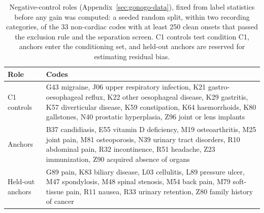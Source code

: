 \begin{table}[t]
\caption{Negative-control roles (Appendix~\ref{sec:gonogo-data}), fixed from label statistics before any gain was computed: a seeded random split, within two recording categories, of the 33 non-cardiac codes with at least 250 clean onsets that passed the exclusion rule and the separation screen. C1 controls test condition C1, anchors enter the conditioning set, and held-out anchors are reserved for estimating residual bias.}
\label{tab:gonogo-roles}
\centering
\small
\begin{tabular}{@{}lp{}@{}}
\toprule
\textbf{Role} & \textbf{Codes} \\
\midrule
C1 controls & G43 migraine, J06 upper respiratory infection, K21 gastro-oesophageal reflux, K22 other oesophageal disease, K29 gastritis, K57 diverticular disease, K59 constipation, K64 haemorrhoids, K80 gallstones, N40 prostatic hyperplasia, Z96 joint or lens implants \\
Anchors & B37 candidiasis, E55 vitamin D deficiency, M19 osteoarthritis, M25 joint pain, M81 osteoporosis, N39 urinary tract disorders, R10 abdominal pain, R32 incontinence, R51 headache, Z23 immunization, Z90 acquired absence of organs \\
Held-out anchors & G89 pain, K83 biliary disease, L03 cellulitis, L89 pressure ulcer, M47 spondylosis, M48 spinal stenosis, M54 back pain, M79 soft-tissue pain, R11 nausea, R33 urinary retention, Z80 family history of cancer \\
\bottomrule
\end{tabular}
\end{table}

